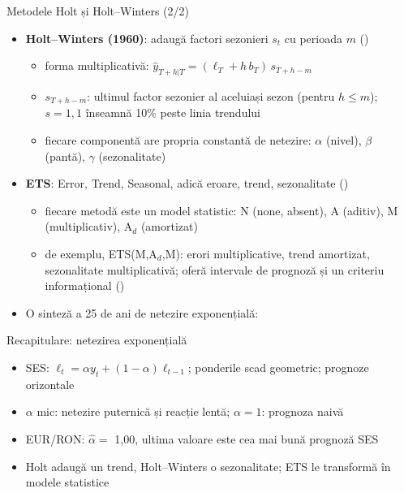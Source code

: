 \begin{frame}{Metodele Holt și Holt--Winters (2/2)}
\itemsize{\footnotesize}
\begin{itemize}
    \item \textbf{Holt--Winters (1960)}: adaugă factori sezonieri $s_t$ cu perioada $m$ ()
    \begin{itemize}
        \item forma multiplicativă: $\hat y_{T+h|T} = (\ell_T + h\, b_T)\, s_{T+h-m}$
        \item $s_{T+h-m}$: ultimul factor sezonier al aceluiași sezon (pentru $h \le m$); $s = 1{,}1$ înseamnă 10\% peste linia trendului
        \item fiecare componentă are propria constantă de netezire: $\alpha$ (nivel), $\beta$ (pantă), $\gamma$ (sezonalitate)
    \end{itemize}
    \item \textbf{ETS}: Error, Trend, Seasonal, adică eroare, trend, sezonalitate ()
    \begin{itemize}
        \item fiecare metodă este un model statistic: N (none, absent), A (aditiv), M (multiplicativ), A$_d$ (amortizat)
        \item de exemplu, ETS(M,A$_d$,M): erori multiplicative, trend amortizat, sezonalitate multiplicativă; oferă intervale de prognoză și un criteriu informațional ()
    \end{itemize}
    \item O sinteză a 25 de ani de netezire exponențială: 
\end{itemize}
\end{frame}

\begin{frame}{Recapitulare: netezirea exponențială}
\itemsize{\small}
\begin{itemize}
    \item SES: $\ell_t = \alpha y_t + (1-\alpha)\ell_{t-1}$; ponderile scad geometric; prognoze orizontale
    \item $\alpha$ mic: netezire puternică și reacție lentă; $\alpha = 1$: prognoza naivă
    \item EUR/RON: $\hat\alpha = $ 1{,}00, ultima valoare este cea mai bună prognoză SES
    \item Holt adaugă un trend, Holt--Winters o sezonalitate; ETS le transformă în modele statistice
\end{itemize}
\end{frame}


